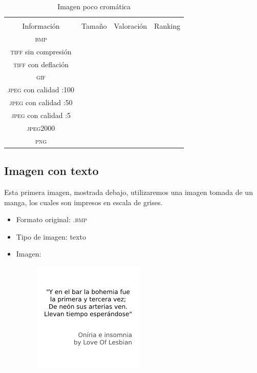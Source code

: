 \documentclass[11pt,a4paper]{article}
\begin{document}
\begin{table}[H]
\centering
\begin{tabular}{|c|c|c|c|}
\hline
\diagbox[width=15em]{\textit{Códec}/Formato}{\\Información} & Tamaño & Valoración & Ranking \\
\hline
\textsc{bmp} &  &  &  \\ \hline
\textsc{tiff} sin compresión &  &  &  \\ \hline
\textsc{tiff} con deflación &  &  &  \\ \hline
\textsc{gif} &  &  &  \\ \hline
\textsc{jpeg} con calidad :100 &  &  &  \\ \hline
\textsc{jpeg} con calidad :50 &  &  &  \\ \hline
\textsc{jpeg} con calidad :5 &  &  &  \\ \hline
\textsc{jpeg2000} &  &  &  \\ \hline
\textsc{png} &  &  &  \\ \hline
\end{tabular}
\caption{Imagen poco cromática}
\label{tab:my-table}
\end{table}


\subsection{Imagen con texto}

Esta primera imagen, mostrada debajo, utilizaremos una imagen tomada de un manga, los cuales son impresos en escala de grises.

\begin{itemize}
	\item Formato original: \textsc{.bmp}
	\item Tipo de imagen: texto
	\item Imagen:
		\begin{figure}[H]
		\centering
			\includegraphics[width=0.5\textwidth]{Fotos/texto.png}
		\end{figure}	
\end{itemize}
\end{document}
